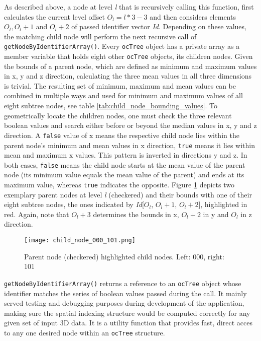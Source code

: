 As described above, a node at level \textit{l} that is recursively calling this function, first calculates the current level offset $O_l = l*3-3$ and then considers elements $O_l, O_l+1$ and $O_l+2$ of passed identifier vector \textit{Id}. Depending on these values, the matching child node will perform the next recursive call of \texttt{getNodeByIdentifierArray()}. Every \texttt{ocTree} object has a private array as a member variable that holds eight other \texttt{ocTree} objects, its children nodes. Given the bounds of a parent node, which are defined as minimum and maximum values in x, y and z direction, calculating the three mean values in all three dimensions is trivial. The resulting  set of minimum, maximum and mean values can be combined in multiple ways and used for minimum and maximum values of all eight subtree nodes, see table \ref{tab:child_node_bounding_values}. To geometrically locate the children nodes, one must check the three relevant boolean values and search either before or beyond the median values in x, y and z direction. A \texttt{false} value of x means the respective child node lies within the parent node's minimum and mean values in x direction, \texttt{true} means it lies within mean and maximum x values. This pattern is inverted in directions y and z. In both cases, \texttt{false} means the child node starts at the mean value of the parent node (its minimum value equals the mean value of the parent) and ends at its maximum value, whereas \texttt{true} indicates the opposite. Figure \ref{fig:child_node_000_101.png} depicts two exemplary parent nodes at level \textit{l} (checkered) and their bounds with one of their eight subtree nodes, the ones indicated by \textit{Id}[$O_l$, $O_l+1$, $O_l+2$], highlighted in red. Again, note that \texttt{$O_l+3$} determines the bounds in x, \texttt{$O_l+2$} in y and \texttt{$O_l$} in z direction.

\begin{figure}[htb]
  \centering
  \texttt{[image: child\_node\_000\_101.png]}\\ %
  \caption{Parent node (checkered) highlighted child nodes. Left: 000, right: 101}\label{fig:child_node_000_101.png}
\end{figure}

	\texttt{getNodeByIdentifierArray()} returns a reference to an \texttt{ocTree} object whose identifier matches the series of boolean values passed during the call. It mainly served testing and debugging purposes during development of the application, making sure the spatial indexing structure would be computed correctly for any given set of input 3D data. It is a utility function that provides fast, direct acces to any one desired node within an \texttt{ocTree} structure.

